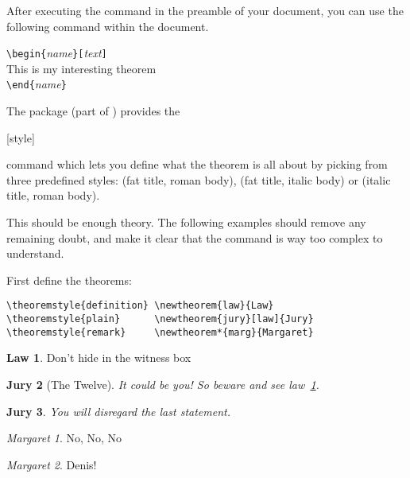 After executing the  command in the preamble of your
document, you can use the following command within the document.
\begin{code}
\verb|\begin{|\emph{name}\verb|}[|\emph{text}\verb|]|\\
This is my interesting theorem\\
\verb|\end{|\emph{name}\verb|}|     
\end{code}

The  package (part of ) provides the 
\begin{lscommand}
[style]
\end{lscommand}
command which lets you define what the theorem is all about by picking
from three predefined styles:  (fat title, roman body),
 (fat title, italic body) or  (italic
title, roman body).

This should be enough theory. The following examples should
remove any remaining doubt, and make it clear that the
 command is way too complex to understand.

\theoremstyle{definition} \newtheorem{law}{Law}
\theoremstyle{plain}      \newtheorem{jury}[law]{Jury}
\theoremstyle{remark}     \newtheorem*{marg}{Margaret}

First define the theorems:

\begin{verbatim}
\theoremstyle{definition} \newtheorem{law}{Law}
\theoremstyle{plain}      \newtheorem{jury}[law]{Jury}
\theoremstyle{remark}     \newtheorem*{marg}{Margaret}
\end{verbatim}

\begin{example}
\begin{law} \label{law:box}
Don't hide in the witness box
\end{law}
\begin{jury}[The Twelve]
It could be you! So beware and
see law~\ref{law:box}.\end{jury}
\begin{jury}
You will disregard the last
statement.\end{jury}
\begin{marg}No, No, No\end{marg}
\begin{marg}Denis!\end{marg}
\end{example}

